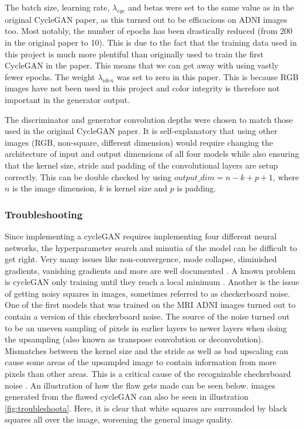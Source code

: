 \documentclass[12pt, fleqn, titlepage]{article}
\begin{document}
The batch size, learning rate, $\lambda_{cyc}$ and betas were set to the same value as in the original CycleGAN paper, as this turned out to be efficacious on ADNI images too. Most notably, the number of epochs has been drastically reduced (from 200 in the original paper to 10). This is due to the fact that the training data used in this project is much more plentiful than originally used to train the first CycleGAN in the paper. This means that we can get away with using vastly fewer epochs. The weight $\lambda_{iden}$ was set to zero in this paper. This is because RGB images have not been used in this project and color integrity is therefore not important in the generator output.

The discriminator and generator convolution depths were chosen to match those used in the original CycleGAN paper. It is self-explanatory that using other images (RGB, non-square, different dimension) would require changing the architecture of input and output dimensions of all four models while also ensuring that the kernel size, stride and padding of the convolutional layers are setup correctly. This can be double checked by using $output\_dim = n - k + p + 1$, where $n$ is the image dimension, $k$ is kernel size and $p$ is padding.

\subsubsection{Troubleshooting}\label{troubleshooting}
Since implementing a cycleGAN requires implementing four different neural networks, the hyperparameter search and minutia of the model can be difficult to get right. Very many issues like non-convergence, mode collapse, diminished gradients, vanishing gradients and more are well documented \cite{hard_to_train}. A known problem is cycleGAN only training until they reach a local minimum \cite{ganlocalminimum}. Another is the issue of getting noisy squares in images, sometimes referred to as checkerboard noise. One of the first models that was trained on the MRI ADNI images turned out to contain a version of this checkerboard noise. The source of the noise turned out to be an uneven sampling of pixels in earlier layers to newer layers when doing the upsampling (also known as transpose convolution or deconvolution). Mismatches between the kernel size and the stride as well as bad upscaling can cause some areas of the upsampled image to contain information from more pixels than other areas. This is a critical cause of the recognizable checkerboard noise \cite{checkerboard}. An illustration of how the flaw gets made can be seen below. images generated from the flawed cycleGAN can also be seen in illustration \ref{fig:troubleshoota}. Here, it is clear that white squares are surrounded by black squares all over the image, worsening the general image quality.
\end{document}

